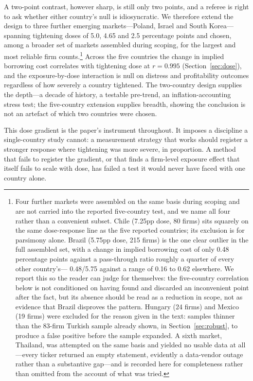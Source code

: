 \documentclass[review,12pt,authoryear]{elsarticle}
\theoremstyle{plain}
\theoremstyle{definition}
\begin{document}
A two-point contrast, however sharp, is still only two points, and a referee
is right to ask whether either country's null is idiosyncratic. We therefore
extend the design to three further emerging markets---Poland, Israel and South
Korea---spanning tightening doses of 5.0, 4.65 and 2.5 percentage points and
chosen, among a broader set of markets assembled during scoping, for the
largest and most reliable firm counts.\footnote{Four further markets were
assembled on the same basis during scoping and are not carried into the
reported five-country test, and we name all four rather than a convenient
subset. Chile (7.25pp dose, 80 firms) sits squarely on the same dose-response
line as the five reported countries; its exclusion is for parsimony alone.
Brazil (5.75pp dose, 215 firms) is the one clear outlier in the full assembled
set, with a change in implied borrowing cost of only 0.48 percentage points
against a pass-through ratio roughly a quarter of every other country's---
0.48/5.75 against a range of 0.16 to 0.62 elsewhere. We report this so the
reader can judge for themselves: the five-country correlation below is not
conditioned on having found and discarded an inconvenient point after the
fact, but its absence should be read as a reduction in scope, not as evidence
that Brazil disproves the pattern. Hungary (24 firms) and Mexico (19 firms)
were excluded for the reason given in the text: samples thinner than the
83-firm Turkish sample already shown, in Section~\ref{sec:robust}, to produce
a false positive before the sample expanded. A sixth market, Thailand, was
attempted on the same basis and yielded no usable data at all---every ticker
returned an empty statement, evidently a data-vendor outage rather than a
substantive gap---and is recorded here for completeness rather than omitted
from the account of what was tried.}
Across the five countries the change in
implied borrowing cost correlates with tightening dose at $r=0.995$
(Section~\ref{sec:dose}), and the exposure-by-dose interaction is null on
distress and profitability outcomes regardless of how severely a country
tightened. The two-country design supplies the depth---a decade of history,
a testable pre-trend, an inflation-accounting stress test; the five-country
extension supplies breadth, showing the conclusion is not an artefact of which
two countries were chosen.

This dose gradient is the paper's instrument throughout. It imposes a
discipline a single-country study cannot: a measurement strategy that works
should register a stronger response where tightening was more severe, in
proportion. A method that fails to register the gradient, or that finds a
firm-level exposure effect that itself fails to scale with dose, has failed a
test it would never have faced with one country alone.
\end{document}
